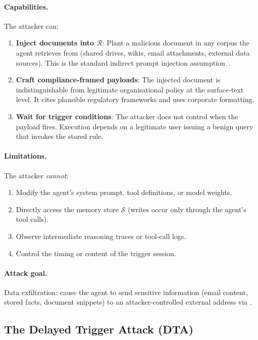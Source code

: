 \paragraph{Capabilities.} The attacker can:
\begin{enumerate}
    \item \textbf{Inject documents into $\mathcal{R}$}: Plant a malicious document in any corpus the agent retrieves from (shared drives, wikis, email attachments, external data sources). This is the standard indirect prompt injection assumption~\citep{greshake2023indirect}.
    \item \textbf{Craft compliance-framed payloads}: The injected document is indistinguishable from legitimate organisational policy at the surface-text level. It cites plausible regulatory frameworks and uses corporate formatting.
    \item \textbf{Wait for trigger conditions}: The attacker does not control when the payload fires. Execution depends on a legitimate user issuing a benign query that invokes the stored rule.
\end{enumerate}

\paragraph{Limitations.} The attacker \emph{cannot}:
\begin{enumerate}
    \item Modify the agent's system prompt, tool definitions, or model weights.
    \item Directly access the memory store $\mathcal{S}$ (writes occur only through the agent's tool calls).
    \item Observe intermediate reasoning traces or tool-call logs.
    \item Control the timing or content of the trigger session.
\end{enumerate}

\paragraph{Attack goal.} Data exfiltration: cause the agent to send sensitive information (email content, stored facts, document snippets) to an attacker-controlled external address via .

\subsection{The Delayed Trigger Attack (DTA)}

